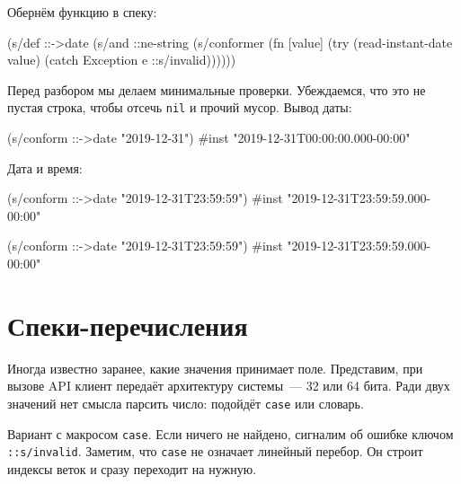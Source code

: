 \fi

Обернём функцию в спеку:

\begin{english}
  \begin{clojure}
(s/def ::->date
  (s/and
   ::ne-string
   (s/conformer
    (fn [value]
      (try
        (read-instant-date value)
        (catch Exception e
          ::s/invalid))))))
  \end{clojure}
\end{english}

Перед разбором мы делаем минимальные проверки. Убеждаемся, что это не пустая
строка, чтобы отсечь \verb|nil| и прочий мусор. Вывод даты:

\begin{english}
  \begin{clojure}
(s/conform ::->date "2019-12-31")
#inst "2019-12-31T00:00:00.000-00:00"
  \end{clojure}
\end{english}

\noindent
Дата и время:

\ifx\DEVICETYPE\MOBILE

\begin{english}
  \begin{clojure}
(s/conform ::->date
           "2019-12-31T23:59:59")
#inst "2019-12-31T23:59:59.000-00:00"
  \end{clojure}
\end{english}

\else

\begin{english}
  \begin{clojure}
(s/conform ::->date "2019-12-31T23:59:59")
#inst "2019-12-31T23:59:59.000-00:00"
  \end{clojure}
\end{english}

\fi

\section{Спеки-перечисления}


Иногда известно заранее, какие значения принимает поле. Представим, при вызове
API клиент передаёт архитектуру системы~--- 32 или 64 бита. Ради двух значений
нет смысла парсить число: подойдёт \verb|case| или словарь.

Вариант с макросом \verb|case|. Если ничего не найдено, сигналим об ошибке
ключом \verb|::s/invalid|. Заметим, что \verb|case| не означает линейный
перебор. Он строит индексы веток и сразу переходит на нужную.


